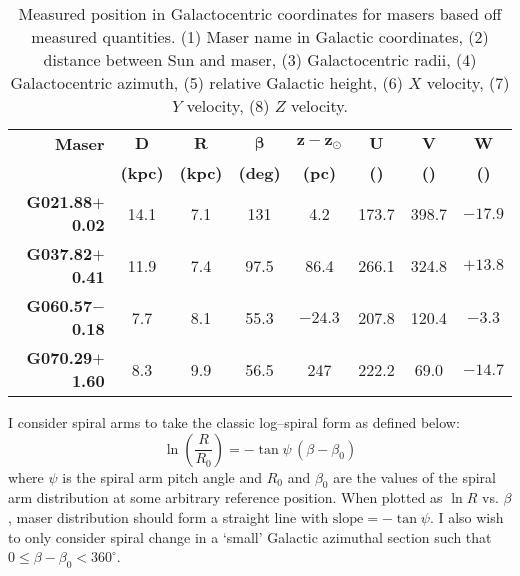 	        \begin{table}[h]
	        	\onehalfspacing
	        	\footnotesize
	        	\centering
	        	\caption[Masers in Galactocentric coordinates]{Measured position in Galactocentric coordinates for masers based off measured quantities. (1) Maser name in Galactic coordinates, (2) distance between Sun and maser, (3) Galactocentric radii, (4) Galactocentric azimuth, (5) relative Galactic height, (6) $X$ velocity, (7) $Y$ velocity, (8) $Z$ velocity.}
	        	\label{tab:maser_xyz}
	        	\begin{tabular}{rccccccc}
	        		\toprule
	        		\textbf{Maser}&$\boldsymbol{D}$&$\boldsymbol{R}$&$\boldsymbol{\beta}$&$\boldsymbol{z-z_\odot}$&$\boldsymbol{U}$&$\boldsymbol{V}$&$\boldsymbol{W}$\\
	        		&\textbf{(kpc)}&\textbf{(kpc)}&\textbf{(deg)}&\textbf{(pc)}&\textbf{(\kms)}&\textbf{(\kms)}&\textbf{(\kms)}\\
	        		\midrule
	        		\textbf{G021.88$+$0.02} & 14.1 & 7.1 & 131 & 4.2     &  173.7 & 398.7 & $-17.9$\\
	        		\textbf{G037.82$+$0.41} & 11.9 & 7.4 & 97.5 & 86.4    &  266.1 & 324.8 & $+13.8$\\
	        		\textbf{G060.57$-$0.18} & 7.7  & 8.1 & 55.3 & $-24.3$ &  207.8 & 120.4 & $ -3.3$\\
	        		\textbf{G070.29$+$1.60} & 8.3  & 9.9 & 56.5 &  247    &  222.2 &  69.0 & $-14.7$\\
	        		\bottomrule
	        	\end{tabular}
	        \end{table}	
	        
			I consider spiral arms to take the classic log--spiral form as defined below:
			\begin{equation*}
			\ln{\left(\frac{R}{R_0}\right)}  = - \tan\psi\,\left(\beta - \beta_0\right) 
			\end{equation*} where $\psi$ is the spiral arm pitch angle and $R_0$ and $\beta_0$ are the values of the spiral arm distribution at some arbitrary reference position. When plotted as $\ln R$ vs. $\beta$, maser distribution should form a straight line with $\text{slope}=-\tan\psi$. I also wish to only consider spiral change in a `small' Galactic azimuthal section such that $0\le\beta-\beta_0<360^\circ$.
			
